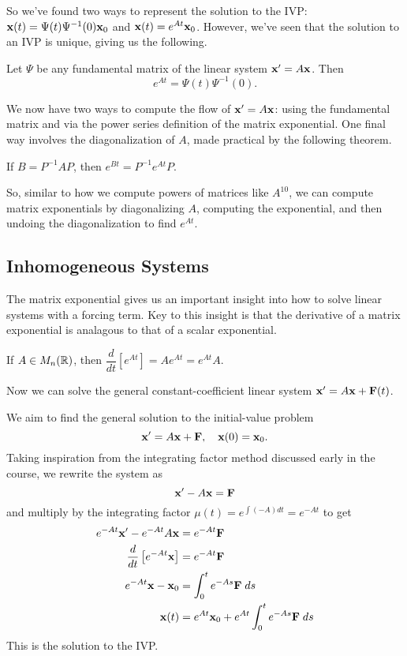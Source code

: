 \documentclass[../m082main.tex]{subfiles}
\begin{document}
So we've found two ways to represent the solution to the IVP: $\mathbf{x}(t) = \Psi(t) \Psi^{-1}(0)\mathbf{x}_0$ and $\mathbf{x}(t) = e^{At} \mathbf{x}_0$.
However, we've seen that the solution to an IVP is unique, giving us the following.

\begin{theorem}[Characterization of $e^{At}$]
    Let $\Psi$ be any fundamental matrix of the linear system $\mathbf{x}' = A\mathbf{x}$.
    Then
    \[ e^{At} = \Psi (t) \Psi^{-1} (0). \]
\end{theorem}

We now have two ways to compute the flow of $\mathbf{x}' = A \mathbf{x}$: using the fundamental matrix and via the power series definition of the matrix exponential.
One final way involves the diagonalization of $A$, made practical by the following theorem.

\begin{theorem}
    If $B = P^{-1} A P$, then $e^{Bt} = P^{-1} e^{At} P$.
\end{theorem}

So, similar to how we compute powers of matrices like $A^{10}$, we can compute matrix exponentials by diagonalizing $A$, computing the exponential, and then undoing the diagonalization to find $e^{At}$.

\subsection{Inhomogeneous Systems}
The matrix exponential gives us an important insight into how to solve linear systems with a forcing term.
Key to this insight is that the derivative of a matrix exponential is analagous to that of a scalar exponential.

\begin{lemma}
    If $A \in M_n (\mathbb{R})$, then $\dfrac{d}{dt} \left[ e^{At} \right] = A e^{At} = e^{At} A$.
\end{lemma}

Now we can solve the general constant-coefficient linear system $\mathbf{x}' = A \mathbf{x} + \mathbf{F}(t)$.

\begin{example}
    We aim to find the general solution to the initial-value problem
    \[ \mathbf{x}' = A \mathbf{x} + \mathbf{F}, \quad \mathbf{x}(0) = \mathbf{x}_0. \]
    Taking inspiration from the integrating factor method discussed early in the course, we rewrite the system as
    \[ \mathbf{x}' - A \mathbf{x} = \mathbf{F} \]
    and multiply by the integrating factor $\mu(t) = e^{\int (-A) dt} = e^{-A t}$ to get
    \begin{align*}
        e^{-At} \mathbf{x}' - e^{-At} A \mathbf{x} &= e^{-At} \mathbf{F} \\
        \frac{d}{dt} \left[ e^{-At} \mathbf{x} \right] &= e^{-At} \mathbf{F} \\
        e^{-At}\mathbf{x} - \mathbf{x}_0 &= \int_{0}^{t} e^{-As} \mathbf{F} \;ds \\
        \mathbf{x}(t) &= e^{At} \mathbf{x}_0 + e^{At} \int_0^t e^{-As} \mathbf{F} \;ds
    \end{align*}
    This is the solution to the IVP.
\end{example}
\end{document}

